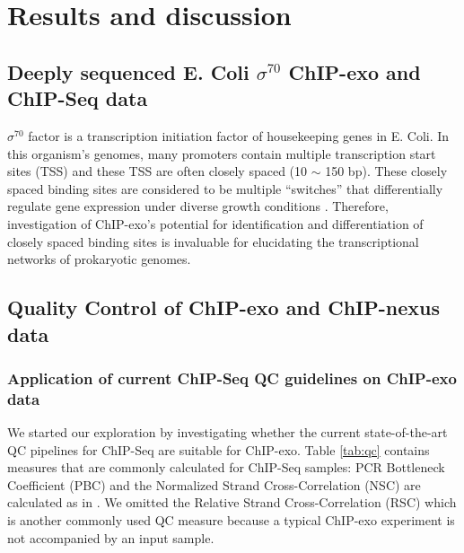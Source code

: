 \documentclass{bmcart}\usepackage[]{graphicx}\usepackage[]{color}
\newcommand{\sig}{\sigma^{70}}
\begin{document}
\section{Results and discussion}
\label{sec:results}

\subsection{Deeply sequenced E. Coli $\sig$ ChIP-exo and ChIP-Seq data}
 
$\sig$ factor is a transcription initiation factor of housekeeping
genes in E. Coli. In this organism's genomes, many promoters contain
multiple transcription start sites (TSS) and these TSS are often
closely spaced (10 $\sim$ 150 bp). These closely spaced binding sites
are considered to be multiple ``switches'' that differentially
regulate gene expression under diverse growth conditions
\cite{regulondb}. Therefore, investigation of ChIP-exo's potential for
identification and differentiation of closely spaced binding sites is
invaluable for elucidating the transcriptional networks of prokaryotic
genomes.

\subsection{Quality Control of ChIP-exo and ChIP-nexus data}

\subsubsection{Application of current ChIP-Seq QC guidelines on ChIP-exo
  data}


We started our exploration by investigating whether the current
state-of-the-art QC pipelines for ChIP-Seq are suitable for
ChIP-exo. Table \ref{tab:qc} contains measures that are commonly
calculated for ChIP-Seq samples: PCR Bottleneck Coefficient (PBC) and
the Normalized Strand Cross-Correlation (NSC) are calculated as in
\cite{encode_qc}. We omitted the Relative Strand Cross-Correlation
(RSC) which is another commonly used QC measure because a typical
ChIP-exo experiment is not accompanied by an input sample.

\end{document}
